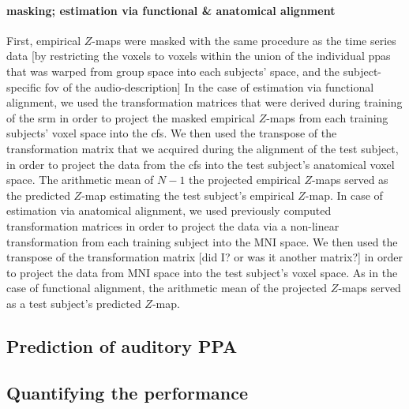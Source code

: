 \paragraph{masking; estimation via functional \& anatomical alignment}
%
First, empirical $Z$-maps were masked with the same procedure as the time series
data [by restricting the voxels to voxels within the union of the individual
\acp{ppa} \citep[s.][]{haeusler2022processing} that was warped from group space
into each subjects' space, and the subject-specific \ac{fov} of the
audio-description]
In the case of estimation via functional alignment, we used the transformation
matrices that were derived during training of the \ac{srm} in order to project
the masked empirical $Z$-maps from each training subjects' voxel space into the
\ac{cfs}.
We then used the transpose of the transformation matrix that we acquired during
the alignment of the test subject, in order to project the data from the
\ac{cfs} into the test subject's anatomical voxel space.
The arithmetic mean of $N-1$ the projected empirical $Z$-maps served as the
predicted $Z$-map estimating the test subject's empirical $Z$-map.
In case of estimation via anatomical alignment, we used previously computed
transformation matrices
\citep[][\href{https://github.com/psychoinformatics-de/studyforrest-data-templatetransforms}{\url{github.com/psychoinformatics-de/studyforrest-data-templatetransforms}}]{hanke2014audiomovie}
in order to project the data via a non-linear transformation from each training
subject into the MNI space.
We then used the transpose of the transformation matrix [did I? or was it
another matrix?] in order to project the data from MNI space into the test
subject's voxel space.
%
As in the case of functional alignment, the arithmetic mean of the projected
$Z$-maps served as a test subject's predicted $Z$-map.



\subsection{Prediction of auditory PPA}



\subsection{Quantifying the performance}


